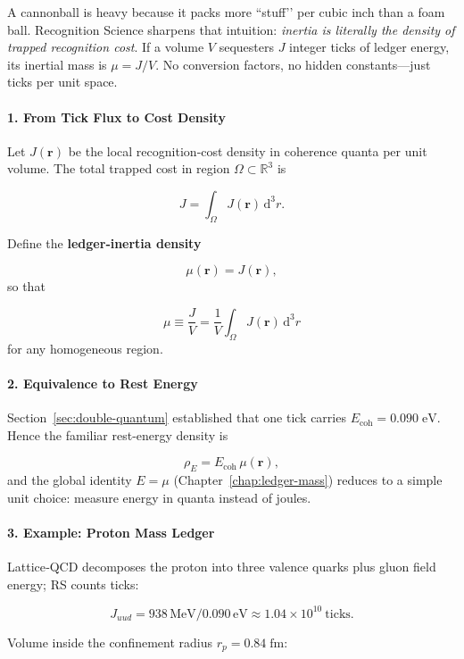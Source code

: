 \documentclass[11pt,oneside]{book}
\begin{document}
A cannonball is heavy because it packs more “stuff’’ per cubic inch than a
foam ball.  
Recognition Science sharpens that intuition:
\emph{inertia is literally the density of trapped recognition cost}.  
If a volume \(V\) sequesters \(J\) integer ticks of ledger energy, its
inertial mass is \(\mu = J/V\).  
No conversion factors, no hidden constants—just ticks per unit space.

\paragraph*{1. From Tick Flux to Cost Density}

Let \(J(\mathbf r)\) be the local recognition‐cost density in
coherence quanta per unit volume.
The total trapped cost in region \(\Omega\subset\mathbb R^3\) is

\[
   J = \int_\Omega J(\mathbf r)\,\mathrm d^3\!r.
\]

Define the \textbf{ledger‐inertia density}

\[
   \mu(\mathbf r)
   =
   J(\mathbf r),
\]
so that

\[
   \boxed{\;
      \mu
      \equiv
      \frac{J}{V}
      =
      \frac{1}{V}
      \int_\Omega J(\mathbf r)\,\mathrm d^3\!r
   \;}
\]
for any homogeneous region.

\paragraph*{2. Equivalence to Rest Energy}

Section~\ref{sec:double-quantum} established that one tick carries
\(E_{\text{coh}} = 0.090\;\text{eV}\).
Hence the familiar rest-energy density is

\[
   \rho_E
   =
   E_{\text{coh}}\,
   \mu(\mathbf r),
\]
and the global identity \(E = \mu\) (Chapter~\ref{chap:ledger-mass})
reduces to a simple unit choice: measure energy in quanta instead of joules.

\paragraph*{3. Example: Proton Mass Ledger}

Lattice‐QCD decomposes the proton into three valence quarks plus gluon
field energy; RS counts ticks:

\[
   J_{uud}
   = 938\,\text{MeV}
     / 0.090\,\text{eV}
   \approx 1.04\times10^{10}\ \text{ticks}.
\]

Volume inside the confinement radius
\(r_p = 0.84\;\text{fm}\):
\end{document}
